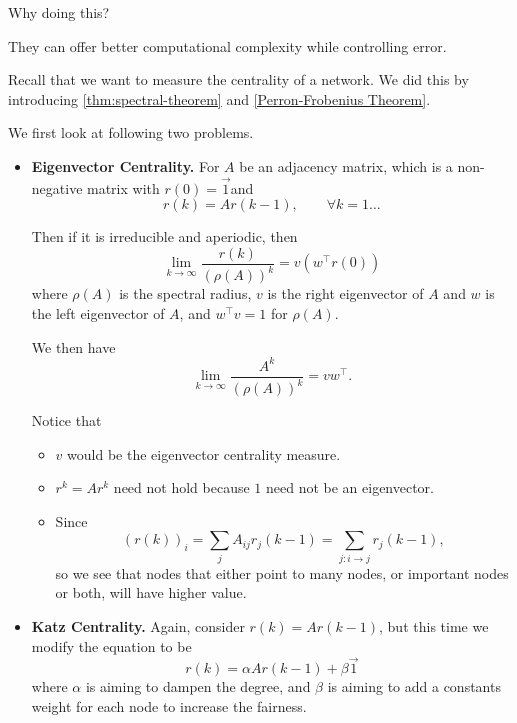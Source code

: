 \begin{problem}
Why doing this?
\end{problem}
\begin{answer}
	They can offer better computational complexity while controlling error.
\end{answer}

\begin{problem}
Recall that we want to measure the centrality of a network. We did this by introducing \autoref{thm:spectral-theorem} and
\autoref{Perron-Frobenius Theorem}.

We first look at following two problems.
\begin{itemize}
	\item \textbf{Eigenvector Centrality.} For \(A\) be an adjacency matrix, which is a non-negative matrix with \(r(0) = \vec{1}\)and
	      \[
		      r(k) = Ar(k - 1), \qquad \forall k = 1\ldots
	      \]

	      Then if it is irreducible and aperiodic, then
	      \[
		      \lim_{k\to \infty } \frac{r(k)}{(\rho(A))^k} = v(w^{\top} r(0))
	      \]
	      where \(\rho(A)\) is the spectral radius, \(v\) is the right eigenvector of \(A\) and \(w\) is the left eigenvector of \(A\), and \(w^{\top}v = 1\) for \(\rho(A)\).

	      We then have
	      \[
		      \lim_{k\to \infty}\frac{A^k}{(\rho(A))^k} = vw^{\top}.
	      \]

	      \begin{remark}
		      Notice that
		      \begin{itemize}
			      \item \(v\) would be the eigenvector centrality measure.
			      \item \(r^k = A r^k\) need not hold because \(1\) need not be an eigenvector.
			      \item Since
			            \[
				            (r(k))_i = \sum\limits_{j} A_{ij}r_{j}(k - 1) = \sum\limits_{j:i\to j} r_j(k-1),
			            \]
			            so we see that nodes that either point to many nodes, or important nodes or both, will have higher value.
		      \end{itemize}
	      \end{remark}
	\item \textbf{Katz Centrality.} Again, consider \(r(k) = Ar(k - 1)\), but this time we modify the equation to be
	      \[
		      r(k) = \alpha Ar(k - 1) + \beta \vec{1}
	      \]
	      where \(\alpha\) is aiming to dampen the degree, and \(\beta\) is aiming to add a constants weight for each node to increase the fairness.


\end{itemize}
\end{problem}
